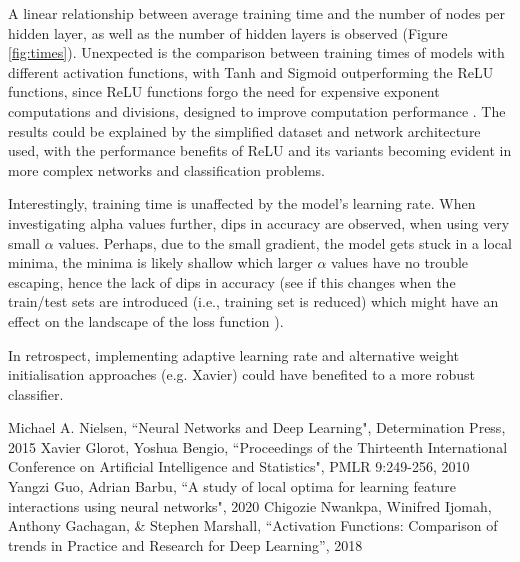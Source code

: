 \documentclass[12pt]{article}
\begin{document}
A linear relationship between average training time and the number of nodes per hidden layer, as well as the number of hidden layers is observed (Figure \ref{fig:times}). Unexpected is the comparison between training times of models with different activation functions, with Tanh and Sigmoid outperforming the ReLU functions, since ReLU functions forgo the need for expensive exponent computations and divisions, designed to improve computation performance \cite{Niwa}. The results could be explained by the simplified dataset and network architecture used, with the performance benefits of ReLU and its variants becoming evident in more complex networks and classification problems.

Interestingly, training time is unaffected by the model's learning rate. When investigating alpha values further, dips in accuracy are observed, when using very small $\alpha$ values. Perhaps, due to the small gradient, the model gets stuck in a local minima, the minima is likely shallow which larger $\alpha$ values have no trouble escaping, hence the lack of dips in accuracy (see if this changes when the train/test sets are introduced (i.e., training set is reduced) which might have an effect on the landscape of the loss function \cite{Guo}).

In retrospect, implementing adaptive learning rate and alternative weight initialisation approaches (e.g. Xavier) could have benefited to a more robust classifier.

\vspace{-1.5em}
\begin{thebibliography}{10}
 Michael A. Nielsen, ``Neural Networks and Deep Learning", Determination Press, 2015
Xavier Glorot, Yoshua Bengio, ``Proceedings of the Thirteenth International Conference on Artificial Intelligence and Statistics", PMLR 9:249-256, 2010
  Yangzi Guo, Adrian Barbu, ``A study of local optima for learning feature interactions using neural networks", 2020
 Chigozie Nwankpa, Winifred Ijomah, Anthony Gachagan, \& Stephen Marshall, ``Activation Functions: Comparison of trends in Practice and Research for Deep Learning'', 2018

\end{thebibliography}
\end{document}
